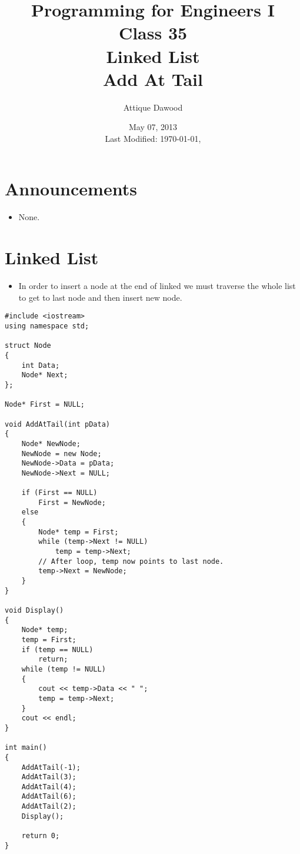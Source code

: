 \documentclass[12pt,a4paper]{article}
\title{\vspace{-2cm}Programming for Engineers I\\Class 35\\Linked List\\Add At Tail}
\author{Attique Dawood}
\date{May 07, 2013\\[0.2cm] Last Modified: \today, \currenttime}
\begin{document}
\maketitle
\section{Announcements}
\begin{itemize}
\item None.
\end{itemize}
\section{Linked List}
\begin{itemize}
\item In order to insert a node at the end of linked we must traverse the whole list to get to last node and then insert new node.
\end{itemize}
\begin{lstlisting}[caption={Linked List: Add at Tail}]
#include <iostream>
using namespace std;

struct Node
{
	int Data;
	Node* Next;
};

Node* First = NULL;

void AddAtTail(int pData)
{
	Node* NewNode;
	NewNode = new Node;
	NewNode->Data = pData;
	NewNode->Next = NULL;

	if (First == NULL)
		First = NewNode;
	else
	{
		Node* temp = First;
		while (temp->Next != NULL)
			temp = temp->Next;
		// After loop, temp now points to last node.
		temp->Next = NewNode;
	}
}

void Display()
{
	Node* temp;
	temp = First;
	if (temp == NULL)
		return;
	while (temp != NULL)
	{
		cout << temp->Data << " ";
		temp = temp->Next;
	}
	cout << endl;
}

int main()
{
	AddAtTail(-1);
	AddAtTail(3);
	AddAtTail(4);
	AddAtTail(6);
	AddAtTail(2);
	Display();

	return 0;
}
\end{lstlisting}
\end{document}
